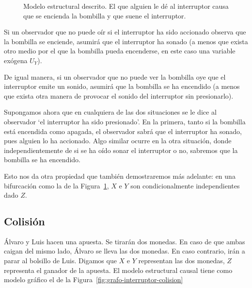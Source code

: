 \documentclass[a4paper,11pt,spanish, twoside]{tfg-uam-matematicas_25-26}
\theoremstyle{definition}
\begin{document}
\begin{figure}[ht]
    \centering
{}
\caption{Modelo estructural descrito. El que alguien le dé al interruptor causa que se encienda la bombilla y que suene el interruptor.}
\label{fig:grafo-interruptor-fork}
\end{figure}

Si un observador que no puede oír si el interruptor ha sido accionado observa que la bombilla se enciende, asumirá que el interruptor ha sonado (a menos que exista otro medio por el que la bombilla pueda encenderse, en este caso una variable exógena $U_Y$).

De igual manera, si un observador que no puede ver la bombilla oye que el interruptor emite un sonido, asumirá que la bombilla se ha encendido (a menos que exista otra manera de provocar el sonido del interruptor sin presionarlo).

Supongamos ahora que en cualquiera de las dos situaciones se le dice al observador `el interruptor ha sido presionado'. En la primera, tanto si la bombilla está encendida como apagada, el observador sabrá que el interruptor ha sonado, pues alguien lo ha accionado. Algo similar ocurre en la otra situación, donde independientemente de si se ha oído sonar el interruptor o no, sabremos que la bombilla se ha encendido.

Esto nos da otra propiedad que también demostraremos más adelante: en una bifurcación como la de la Figura~\ref{fig:grafo-interruptor-fork}, $X$ e $Y$ son condicionalmente independientes dado $Z$.

\subsection{Colisión}
Álvaro y Luis hacen una apuesta. Se tirarán dos monedas. En caso de que ambas caigan del mismo lado, Álvaro se lleva las dos monedas. En caso contrario, irán a parar al bolsillo de Luis. Digamos que $X$ e $Y$ representan las dos monedas, $Z$ representa el ganador de la apuesta. El modelo estructural causal tiene como modelo gráfico el de la Figura~\ref{fig:grafo-interruptor-colision}
\end{document}
